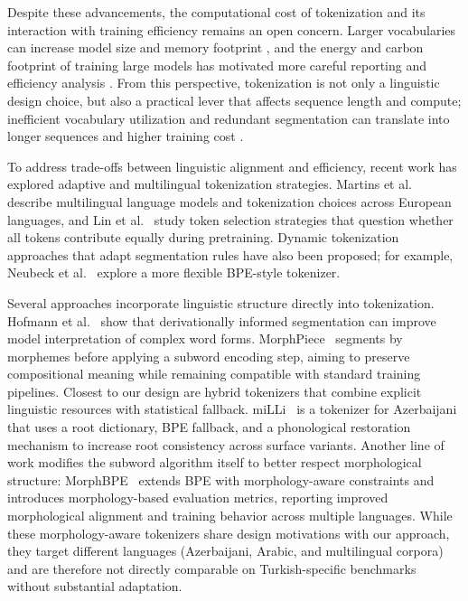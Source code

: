 Despite these advancements, the computational cost of tokenization and its interaction with training efficiency remains an open concern. Larger vocabularies can increase model size and memory footprint \cite{devlin_bert_2019, liu_roberta_2019}, and the energy and carbon footprint of training large models has motivated more careful reporting and efficiency analysis \cite{henderson_towards_2022}. From this perspective, tokenization is not only a linguistic design choice, but also a practical lever that affects sequence length and compute; inefficient vocabulary utilization and redundant segmentation can translate into longer sequences and higher training cost \cite{henderson_towards_2022}.

To address trade-offs between linguistic alignment and efficiency, recent work has explored adaptive and multilingual tokenization strategies. Martins et al.~\cite{martins_eurollm_2024} describe multilingual language models and tokenization choices across European languages, and Lin et al.~\cite{lin_not_2025} study token selection strategies that question whether all tokens contribute equally during pretraining. Dynamic tokenization approaches that adapt segmentation rules have also been proposed; for example, Neubeck et al.~\cite{neubeck_bpe_2024} explore a more flexible BPE-style tokenizer.

Several approaches incorporate linguistic structure directly into tokenization. Hofmann et al.~\cite{hofmann_superbizarre_2021} show that derivationally informed segmentation can improve model interpretation of complex word forms. MorphPiece~\cite{jabbar_morphpiece_2024} segments by morphemes before applying a subword encoding step, aiming to preserve compositional meaning while remaining compatible with standard training pipelines. Closest to our design are hybrid tokenizers that combine explicit linguistic resources with statistical fallback. miLLi~\cite{rahimov_milli_2025} is a tokenizer for Azerbaijani that uses a root dictionary, BPE fallback, and a phonological restoration mechanism to increase root consistency across surface variants. Another line of work modifies the subword algorithm itself to better respect morphological structure: MorphBPE~\cite{asgari_morphbpe_2025} extends BPE with morphology-aware constraints and introduces morphology-based evaluation metrics, reporting improved morphological alignment and training behavior across multiple languages. While these morphology-aware tokenizers share design motivations with our approach, they target different languages (Azerbaijani, Arabic, and multilingual corpora) and are therefore not directly comparable on Turkish-specific benchmarks without substantial adaptation.

